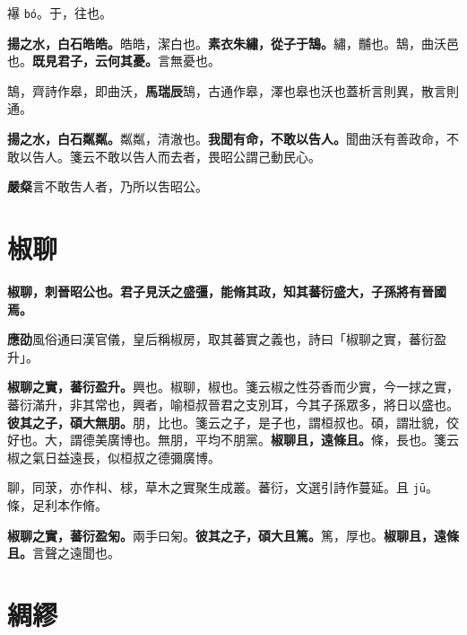 \begin{quoting}襮 \texttt{bó}。于，往也。\end{quoting}

\textbf{揚之水，白石皓皓。}{\footnotesize 皓皓，潔白也。}\textbf{素衣朱繡，從子于鵠。}{\footnotesize 繡，黼也。鵠，曲沃邑也。}\textbf{既見君子，云何其憂。}{\footnotesize 言無憂也。}

\begin{quoting}鵠，齊詩作皋，即曲沃，\textbf{馬瑞辰}鵠，古通作皋，澤也皋也沃也蓋析言則異，散言則通。\end{quoting}

\textbf{揚之水，白石粼粼。}{\footnotesize 粼粼，清澈也。}\textbf{我聞有命，不敢以告人。}{\footnotesize 聞曲沃有善政命，不敢以告人。箋云不敢以告人而去者，畏昭公謂己動民心。}

\begin{quoting}\textbf{嚴粲}言不敢吿人者，乃所以吿昭公。\end{quoting}

\section{椒聊}


\textbf{椒聊，刺晉昭公也。君子見沃之盛彊，能脩其政，知其蕃衍盛大，子孫將有晉國焉。}

\begin{quoting}\textbf{應劭}風俗通曰漢官儀，皇后稱椒房，取其蕃實之義也，詩曰「椒聊之實，蕃衍盈升」。\end{quoting}

\textbf{椒聊之實，蕃衍盈升。}{\footnotesize 興也。椒聊，椒也。箋云椒之性芬香而少實，今一捄之實，蕃衍滿升，非其常也，興者，喻桓叔晉君之支別耳，今其子孫眾多，將日以盛也。}\textbf{彼其之子，碩大無朋。}{\footnotesize 朋，比也。箋云之子，是子也，謂桓叔也。碩，謂壯貌，佼好也。大，謂德美廣博也。無朋，平均不朋黨。}\textbf{椒聊且，遠條且。}{\footnotesize 條，長也。箋云椒之氣日益遠長，似桓叔之德彌廣博。}

\begin{quoting}聊，同莍，亦作朻、梂，草木之實聚生成叢。蕃衍，文選引詩作蔓延。且 \texttt{jū}。條，足利本作脩。\end{quoting}

\textbf{椒聊之實，蕃衍盈匊。}{\footnotesize 兩手曰匊。}\textbf{彼其之子，碩大且篤。}{\footnotesize 篤，厚也。}\textbf{椒聊且，遠條且。}{\footnotesize 言聲之遠聞也。}

\section{綢繆}

